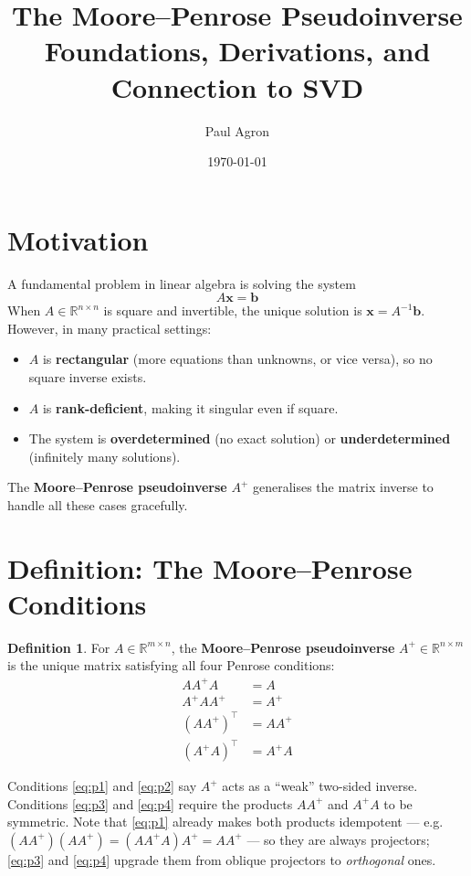 \documentclass[12pt, a4paper]{article}
\title{
    \vspace{-1cm}
    {\Large \textbf{The Moore--Penrose Pseudoinverse}}\\[0.4em]
    {\large Foundations, Derivations, and Connection to SVD}
}
\author{Paul Agron}
\date{\today}
\theoremstyle{definition}
\newtheorem{definition}{Definition}
\begin{document}
\maketitle
\tableofcontents
\newpage

\section{Motivation}

A fundamental problem in linear algebra is solving the system
\[
    A\mathbf{x} = \mathbf{b}
\]
When $A \in \mathbb{R}^{n \times n}$ is square and invertible, the unique solution is $\mathbf{x} = A^{-1}\mathbf{b}$.
However, in many practical settings:

\begin{itemize}
    \item $A$ is \textbf{rectangular} (more equations than unknowns, or vice versa), so no square inverse exists.
    \item $A$ is \textbf{rank-deficient}, making it singular even if square.
    \item The system is \textbf{overdetermined} (no exact solution) or \textbf{underdetermined} (infinitely many solutions).
\end{itemize}

The \textbf{Moore--Penrose pseudoinverse} $A^+$ generalises the matrix inverse to handle all these cases gracefully.

\section{Definition: The Moore--Penrose Conditions}

\begin{definition}
For $A \in \mathbb{R}^{m \times n}$, the \textbf{Moore--Penrose pseudoinverse} $A^+ \in \mathbb{R}^{n \times m}$ is the unique matrix satisfying all four Penrose conditions:
\begin{align}
    A A^+ A &= A \label{eq:p1}\\
    A^+ A A^+ &= A^+ \label{eq:p2}\\
    (A A^+)^\top &= A A^+ \label{eq:p3}\\
    (A^+ A)^\top &= A^+ A \label{eq:p4}
\end{align}
\end{definition}

Conditions \eqref{eq:p1} and \eqref{eq:p2} say $A^+$ acts as a ``weak'' two-sided inverse. Conditions \eqref{eq:p3} and \eqref{eq:p4} require the products $AA^+$ and $A^+A$ to be symmetric. Note that \eqref{eq:p1} already makes both products idempotent — e.g.\ $(AA^+)(AA^+) = (AA^+A)A^+ = AA^+$ — so they are always projectors; \eqref{eq:p3} and \eqref{eq:p4} upgrade them from oblique projectors to \emph{orthogonal} ones.
\end{document}
